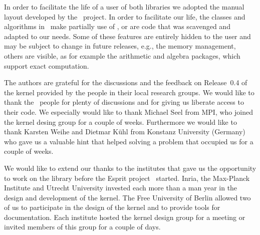 In order to facilitate the life of a user of both
libraries we adopted the manual layout developed by the \leda\
project. In order to facilitate our life, the classes and algorithms
in \cgal\ make partially use of \leda, or are code that was
scavenged and adapted to our needs. Some of these features are
entirely hidden to the user and may be subject to change in
future releases, e.g., the memory management, others are visible, 
as for example the arithmetic and algebra packages, which support 
exact computation.


\medskip
The authors are grateful for the discussions and the feedback on Release~0.4 
of the kernel provided by the people in their local research groups.
We  would like to thank the \leda\ people for plenty of discussions
and for giving us liberate access to their code. We
especially would like to thank Michael Seel from MPI, who joined the
kernel desing group for a couple of weeks.
Furthermore we would like to thank Karsten 
Weihe and Dietmar K\"uhl from Konstanz University (Germany) who
gave us a valuable hint that helped solving a problem that occupied us
for a couple of weeks. 

\smallskip
We would like to extend our thanks to the institutes that gave us the
opportunity to work on the library before the Esprit project \cgal\
started.  {\sc Inria}, the Max-Planck Institute and Utrecht University
invested each more than a man year in the design and development of
the kernel.  The Free University of Berlin allowed two of us to
participate in the design of the kernel and to provide tools for
documentation. Each institute hosted the kernel design group for a
meeting or invited members of this group for a couple of days.
